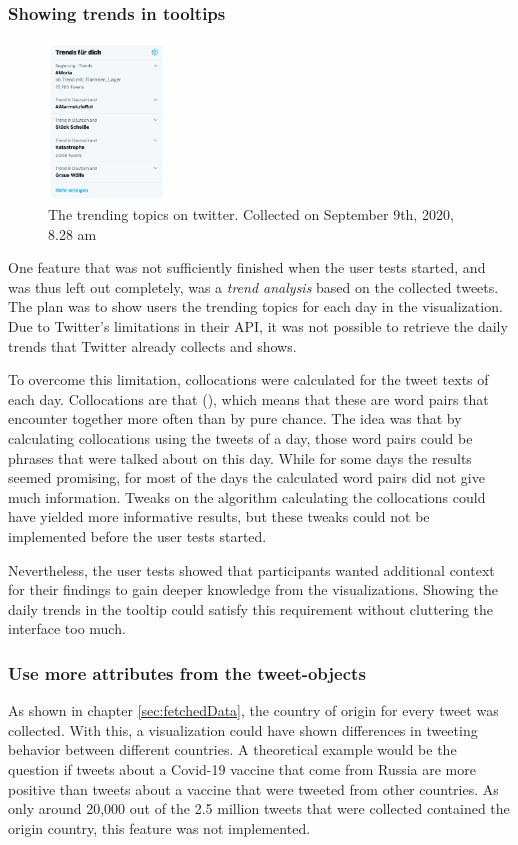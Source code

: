 \subsubsection*{Showing trends in tooltips}
\begin{figure}
    \includegraphics[width=0.28\textwidth]{images/twitter_trends.jpg}
    \caption{The trending topics on twitter. Collected on September 9th, 2020, 8.28 am}
    \label{fig:twitter_trends}
\end{figure}
One feature that was not sufficiently finished when the user tests started, and was thus left out completely, was a \emph{trend analysis} based on the collected tweets. The plan was to show users the trending topics for each day in the visualization. Due to Twitter's limitations in their API, it was not possible to retrieve the daily trends that Twitter already collects and shows.

To overcome this limitation, collocations were calculated for the tweet texts of each day. Collocations are  that  (\cite[2]{mckeown2000collocations}), which means that these are word pairs that encounter together more often than by pure chance. The idea was that by calculating collocations using the tweets of a day, those word pairs could be phrases that were talked about on this day. While for some days the results seemed promising, for most of the days the calculated word pairs did not give much information. Tweaks on the algorithm calculating the collocations could have yielded more informative results, but these tweaks could not be implemented before the user tests started.

Nevertheless, the user tests showed that participants wanted additional context for their findings to gain deeper knowledge from the visualizations. Showing the daily trends in the tooltip could satisfy this requirement without cluttering the interface too much.

\subsubsection*{Use more attributes from the tweet-objects}
As shown in chapter \ref{sec:fetchedData}, the country of origin for every tweet was collected. With this, a visualization could have shown differences in tweeting behavior between different countries. A theoretical example would be the question if tweets about a Covid-19 vaccine that come from Russia are more positive than tweets about a vaccine that were tweeted from other countries. As only around 20,000 out of the 2.5 million tweets that were collected contained the origin country, this feature was not implemented.

